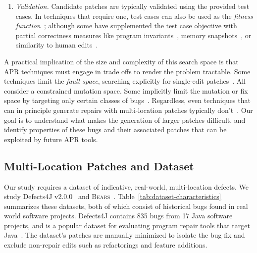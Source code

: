 \documentclass[10pt, conference]{IEEEtran}
\newcommand\bears{\textsc{Bears}\xspace}
\begin{document}
\begin{enumerate}[wide]
\item \emph {Validation.}
Candidate patches are typically
validated using the provided test cases. In techniques
that require one, test cases can also be used as the \emph{fitness
  function}~\cite{genprog}; although some have supplemented the test case
objective with partial correctness measures like program
invariants~\cite{dinglyu}, memory snapshots~\cite{source-code-checkpoint}, or
similarity to human edits~\cite{hdrepair}.

\end{enumerate}

A practical implication of the size and complexity of this search space is
that APR techniques must engage in trade offs to render the problem tractable. 
Some techniques limit the \emph{fault space},
searching explicitly for single-edit patches~\cite{rsrepair,ae,hdrepair,capgen}.
All consider a constrained mutation space. 
Some implicitly limit the mutation or fix space by targeting only certain
classes of bugs~\cite{Xuan17,sapfix,DeMarco14,par}. Regardless, even techniques
that can in principle generate repairs with multi-location patches typically
don't~\cite{patch-correctness}.
%
%
Our goal is to understand what makes the generation of larger
patches difficult, and identify properties of these bugs and their associated
patches that can be exploited by future APR tools.  

\subsection{Multi-Location Patches and Dataset}
\label{sec:bugs}

Our study requires a dataset of indicative, real-world,
multi-location defects.  We study 
Defects4J v2.0.0~\cite{defects4j} and \bears~\cite{bears}.  Table~\ref{tab:dataset-characteristics}
summarizes these datasets, both of which
consist of historical
bugs found in real world software projects. Defects4J contains 835 bugs from 
17 Java software projects, and is a popular dataset for evaluating 
program repair tools that target 
Java~\cite{durieux-repair-them-all,pearson2017evaluating,saha2017elixir,saha2019harnessing,xin2017leveraging,b2016learning}.
The dataset's patches are manually minimized to isolate the bug fix 
and exclude non-repair edits such as refactorings and feature additions.
\end{document}
